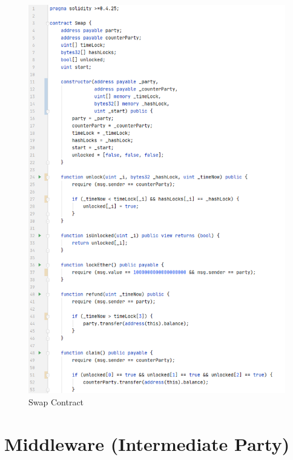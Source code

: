\begin{figure}[h]
	\begin{center}
		\includegraphics[width=0.7\paperwidth]{swap_contract}
		\caption{Swap Contract}
		\label{fig:swap_contract}
	\end{center}
\end{figure}
\clearpage

\section{Middleware (Intermediate Party)}
\label{sec:chapter04:middleware}

